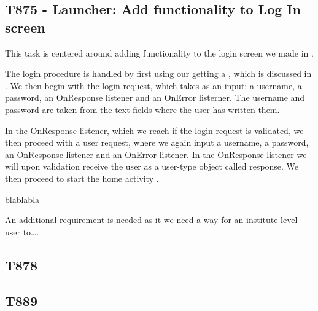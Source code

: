 \subsection{T875 - Launcher: Add functionality to Log In screen}
This task is centered around adding functionality to the login screen we made
in .

The login procedure is handled by first using our getting a , which is discussed in . We then
begin with the login request, which takes as an input: a username, a password,
an OnResponse listener and an OnError listerner. The username and password are
taken from the text fields where the user has written them. 

In the OnResponse listener, which we reach if the login request is validated, we
then proceed with a user request, where we again input a username, a password,
an OnResponse listener and an OnError listener. In the OnResponse listener we
will upon validation receive the user as a user-type object called response. We
then proceed to start the home activity .

blablabla

An additional requirement is needed as it we need a way for an institute-level
user to\ldots. 





\subsection{T878}

\subsection{T889}


